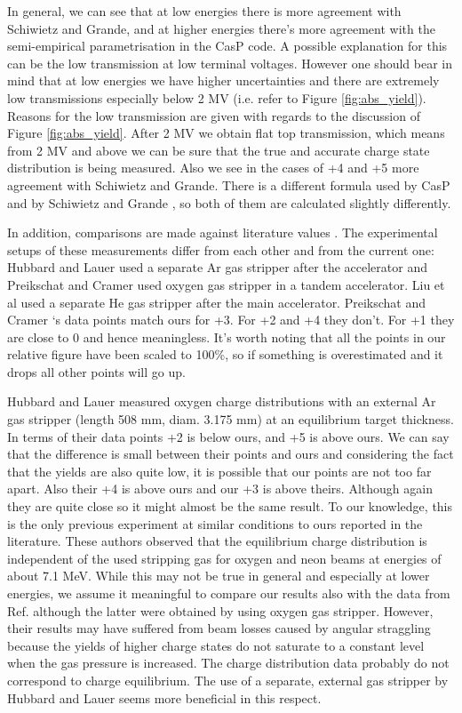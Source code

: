 \documentclass[a4paper,fleqn,review]{cas-sc}
\begin{document}
In general, we can see that at low energies there is more agreement with Schiwietz and Grande, and at higher energies there's more agreement with the semi-empirical parametrisation in the CasP code. A possible explanation for this can be the low transmission at low terminal voltages.  However one should bear in mind that at low energies we have higher uncertainties and there are extremely low transmissions especially below 2 MV (i.e. refer to Figure \ref{fig:abs_yield}). Reasons for the low transmission are given with regards to the discussion of Figure \ref{fig:abs_yield}. After 2 MV we obtain flat top transmission, which means from 2 MV and above we can be sure that the true and accurate charge state distribution is being measured. Also we see in the cases of +4 and +5 more agreement with  Schiwietz and Grande. There is a different formula used by CasP and by Schiwietz and Grande \cite{PrivComm}, so both of them are calculated slightly differently.      

In addition, comparisons are made against literature values \cite{Hubbard1955,preikschat1966charge,Liu2014}. The experimental setups of these measurements differ from each other and from the current one: Hubbard and Lauer used a separate Ar gas stripper after the accelerator and Preikschat and Cramer \cite{preikschat1966charge} used oxygen gas stripper in a tandem accelerator. Liu et al \cite{Liu2014} used a separate He gas stripper after the main accelerator. Preikschat and Cramer \cite{preikschat1966charge} ‘s data points match ours for +3. For +2 and +4 they don’t. For +1 they are close to 0 and hence meaningless. It's worth noting that all the points in our relative figure have been scaled to 100\%, so if something is overestimated and it drops all other points will go up. 

Hubbard and Lauer measured oxygen charge distributions with an external Ar gas stripper (length 508 mm, diam. 3.175 mm) at an equilibrium target thickness. In terms of their data points +2 is below ours, and +5 is above ours. We can say that the difference is small between their points and ours and considering the fact that the yields are also quite low, it is possible that our points are not too far apart. Also their +4 is above ours and our +3 is above theirs. Although again they are quite close so it might almost be the same result. To our knowledge, this is the only previous experiment at similar conditions to ours reported in the literature. These authors observed that the equilibrium charge distribution is independent of the used stripping gas for oxygen and neon beams at energies of about 7.1 MeV. While this may not be true in general and especially at lower energies, we assume it meaningful to compare our results also with the data from Ref. \cite{preikschat1966charge} although the latter were obtained by using oxygen gas stripper. However, their results may have suffered from beam losses caused by angular straggling because the yields of higher charge states do not saturate to a constant level when the gas pressure is increased. The charge distribution data probably do not correspond to charge equilibrium. The use of a separate, external gas stripper by Hubbard and Lauer seems more beneficial in this respect.
\end{document}
